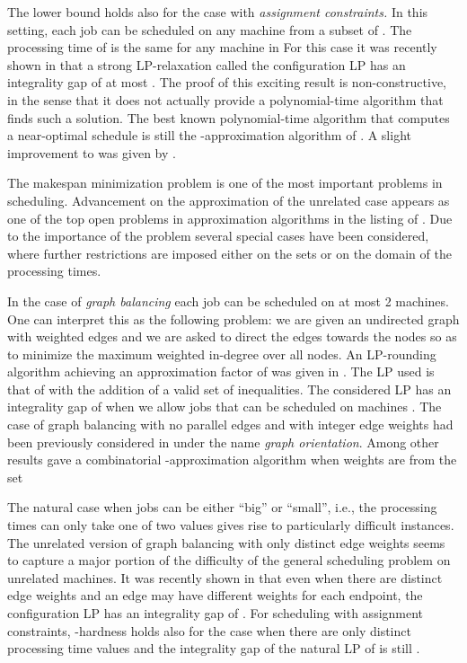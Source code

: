 \documentclass[11pt]{article}\usepackage{amsmath}
\begin{document}
The   lower bound  holds also for  the case with  {\em assignment
  constraints.} In this setting, each  job  can be scheduled on any
machine from a subset  of  . The processing time  of  is the
same for any machine in  
For this case it was recently shown in \cite{svensson} that a strong
LP-relaxation called the configuration LP has an integrality gap of at
most  .   The  proof   of  this  exciting   result  is
non-constructive, in  the sense  that it does  not actually  provide a
polynomial-time algorithm  that finds such a solution.  The best known
polynomial-time  algorithm that  computes a  near-optimal  schedule is
still the -approximation algorithm of \cite{lenstra}. A slight improvement to
 was given by \cite{ShchepinV05}. 

The  makespan  minimization  problem  is  one of  the  most  important
problems  in  scheduling.  Advancement  on the  approximation  of  the
unrelated  case  appears as  one  of the  top    open problems  in
approximation  algorithms in  the  listing of  \cite{sw}.  Due to  the
importance of the problem several special cases have been considered,
where further  restrictions are imposed  either on the sets   or
on the domain of the processing times. 

 In the case of \emph{graph balancing} each job can be scheduled on at
 most  2  machines. One  can  interpret  this  as  the  following
 problem: we are given an undirected graph with weighted edges and we are asked to
 direct  the edges towards  the nodes  so as  to minimize  the maximum
 weighted in-degree over all nodes. An LP-rounding algorithm achieving
 an approximation factor of   was given in \cite{ebenlendr}. The
 LP  used is  that  of \cite{lenstra}  with  the addition  of a valid set of
  inequalities. The considered  LP has an integrality gap  of  when we
 allow jobs that can be scheduled on  machines \cite{svensson}. The
 case of graph balancing with no parallel edges and with integer edge
 weights had been previously considered in
 \cite{asa}  under  the  name  \emph{graph orientation}.  Among  other
 results         \cite{asa}        gave         a        combinatorial
 -approximation algorithm when weights are from the 
 set 


The natural case when jobs can be either ``big'' or ``small'', i.e., the processing
times  can  only take one of two values gives
rise to particularly difficult instances.
The unrelated version of graph balancing with only  distinct
edge weights seems to capture a major portion
of the difficulty of the general scheduling problem on unrelated machines.  It was
 recently shown in  \cite{jose} 
that even when  there are  distinct edge weights and 
an  edge   may  have  different  weights  for   each  endpoint,  the
configuration  LP has  an  integrality gap  of  . 
For scheduling with assignment constraints, 
-hardness    holds also for 
the case when there are
only   distinct processing time values \cite{lenstra} and  the  integrality  gap  of  the
natural LP of
\cite{lenstra}  is  still  \cite{ebenlendr}.
\end{document}
